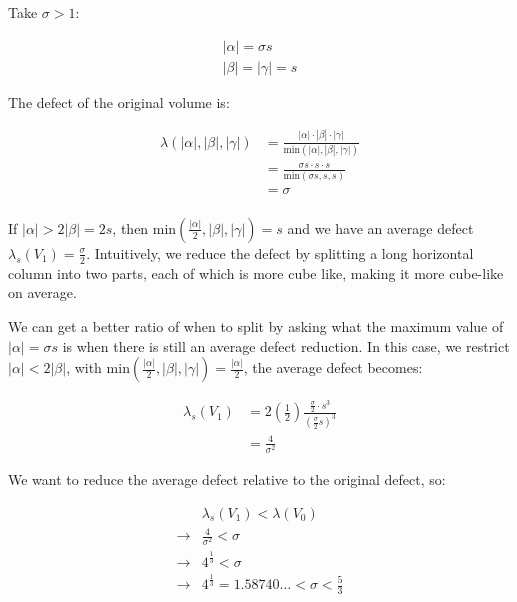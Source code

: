 Take $\sigma > 1$:

$$
\begin{array}{l}
  |\alpha| = \sigma s \\
  |\beta| = |\gamma| = s
\end{array}
$$

The defect of the original volume is:


$$
\begin{array}{ll}
  \lambda(|\alpha|,|\beta|,|\gamma|)  & = \frac{ |\alpha| \cdot |\beta| \cdot |\gamma| }{ \text{min}(|\alpha|,|\beta|,|\gamma|) } \\
                  & = \frac{ \sigma s \cdot s \cdot s }{ \text{min}(\sigma s,s,s) } \\
                  & = \sigma \\
\end{array}
$$

If $|\alpha| > 2 |\beta| = 2s$, then $\text{min}(\frac{|\alpha|}{2},|\beta|,|\gamma|) = s$ and we have an average defect $\lambda_s(V_1) = \frac{\sigma}{2}$.
Intuitively, we reduce the defect by splitting a long horizontal column into two parts, each of which is more cube like,
making it more cube-like on average.

We can get a better ratio of when to split by asking what the maximum value of $|\alpha| = \sigma s$ is when there is still an average defect reduction.
In this case, we restrict $|\alpha| < 2 |\beta|$, with $\text{min}(\frac{|\alpha|}{2},|\beta|,|\gamma|) = \frac{|\alpha|}{2}$,
the average defect becomes:

$$
\begin{array}{ll}
  \lambda_s(V_1) & = 2 (\frac{1}{2}) \frac{ \frac{\sigma}{2} \cdot s^3 }{ (\frac{\sigma}{2} s)^3 } \\
   & = \frac{4}{\sigma^2}
\end{array}
$$

We want to reduce the average defect relative to the original defect, so:

$$
\begin{array}{ll}
  & \lambda_s (V_1) < \lambda(V_0) \\
  \to & \frac{4}{\sigma^2} < \sigma \\
  \to & 4^{\frac{1}{3}} < \sigma \\ 
  \to & 4^{\frac{1}{3}} = 1.58740\dots < \sigma < \frac{5}{3} \\
\end{array}
$$

